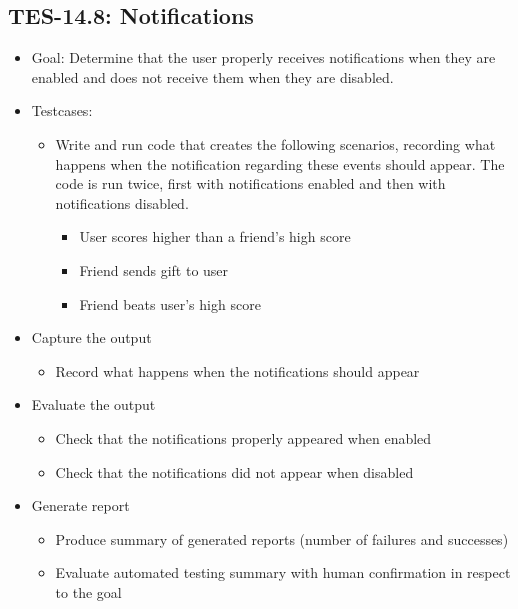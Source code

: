 \subsection{TES-14.8: Notifications}
\label{subsec:notifications}
\begin{itemize}
\item Goal: Determine that the user properly receives notifications when 
they are enabled and does not receive them when they are disabled.

\item Testcases: 
\begin{itemize}
\item Write and run code that creates the following scenarios, recording 
what happens when the notification regarding these events should appear. 
The code is run twice, first with notifications enabled and then with 
notifications disabled.
\begin{itemize}
\item User scores higher than a friend\textquoteright{}s high score
\item Friend sends gift to user
\item Friend beats user\textquoteright{}s high score
\end{itemize}
\end{itemize}

\item Capture the output 
\begin{itemize}
\item Record what happens when the notifications should appear
\end{itemize}

\item Evaluate the output 
\begin{itemize}
\item Check that the notifications properly appeared when enabled
\item Check that the notifications did not appear when disabled
\end{itemize}

\item Generate report 
\begin{itemize}
\item Produce summary of generated reports (number of failures and successes)
\item Evaluate automated testing summary with human confirmation in respect to the goal
\end{itemize}
\end{itemize}

